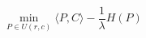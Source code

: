 \begin{theorem}
\begin{equation}
  \min_{P \in U(r,c)} \langle P, C \rangle - \frac{1}{\lambda} H(P)
\end{equation}
\end{theorem}
